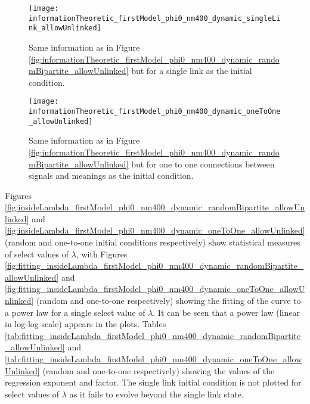 \begin{figure}
  \centering
  \texttt{[image: informationTheoretic\_firstModel\_phi0\_nm400\_dynamic\_singleLink\_allowUnlinked]}
  \caption{Same information as in Figure \ref{fig:informationTheoretic_firstModel_phi0_nm400_dynamic_randomBipartite_allowUnlinked} but for a single link as the initial condition.}
  \label{fig:informationTheoretic_firstModel_phi0_nm400_dynamic_singleLink_allowUnlinked}
\end{figure}

\begin{figure}
  \centering
  \texttt{[image: informationTheoretic\_firstModel\_phi0\_nm400\_dynamic\_oneToOne\_allowUnlinked]}
  \caption{Same information as in Figure \ref{fig:informationTheoretic_firstModel_phi0_nm400_dynamic_randomBipartite_allowUnlinked} but for one to one connections between signals and meanings as the initial condition.}
  \label{fig:informationTheoretic_firstModel_phi0_nm400_dynamic_oneToOne_allowUnlinked}
\end{figure}

Figures \ref{fig:insideLambda_firstModel_phi0_nm400_dynamic_randomBipartite_allowUnlinked} and \ref{fig:insideLambda_firstModel_phi0_nm400_dynamic_oneToOne_allowUnlinked} (random and one-to-one initial conditions respectively) show statistical measures of select values of $\lambda$, with Figures \ref{fig:fitting_insideLambda_firstModel_phi0_nm400_dynamic_randomBipartite_allowUnlinked} and \ref{fig:fitting_insideLambda_firstModel_phi0_nm400_dynamic_oneToOne_allowUnlinked} (random and one-to-one respectively) showing the fitting of the curve to a power law for a single select value of $\lambda$.
It can be seen that a power law (linear in log-log scale) appears in the plots.
Tables \ref{tab:fitting_insideLambda_firstModel_phi0_nm400_dynamic_randomBipartite_allowUnlinked} and \ref{tab:fitting_insideLambda_firstModel_phi0_nm400_dynamic_oneToOne_allowUnlinked} (random and one-to-one respectively) showing the values of the regression exponent and factor.
The single link initial condition is not plotted for select values of $\lambda$ as it fails to evolve beyond the single link state.

